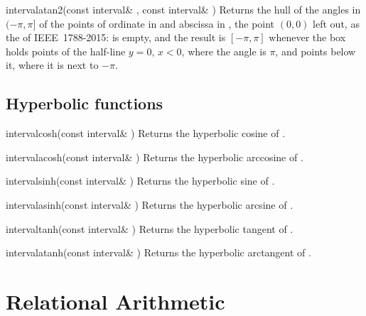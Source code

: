 \documentclass{manual}
\begin{document}
\begin{deffun}{interval}{atan2}{(const interval\& , const interval\& )}
  Returns the hull of the angles in $(-\pi,\pi]$ of the points of ordinate in  and abscissa
  in , the point $(0,0)$ left out, as the  of IEEE~1788-2015:
   is empty, and the result is $[-\pi,\pi]$ whenever the box holds points of the
  half-line $y=0$, $x<0$, where the angle is $\pi$, and points below it, where it is next to $-\pi$.
\end{deffun}

\subsection{Hyperbolic functions}

\begin{deffun}{interval}{cosh}{(const interval\& )}
  Returns the hyperbolic cosine of .
\end{deffun}

\begin{deffun}{interval}{acosh}{(const interval\& )}
  Returns the hyperbolic arccosine of .
\end{deffun}

\begin{deffun}{interval}{sinh}{(const interval\& )}
  Returns the hyperbolic sine of .
\end{deffun}

\begin{deffun}{interval}{asinh}{(const interval\& )}
  Returns the hyperbolic arcsine of .
\end{deffun}

\begin{deffun}{interval}{tanh}{(const interval\& )}
  Returns the hyperbolic tangent of .
\end{deffun}

\begin{deffun}{interval}{atanh}{(const interval\& )}
  Returns the hyperbolic arctangent of .
\end{deffun}

\section{Relational Arithmetic}\label{sec:relational-arithmetic}
\end{document}
